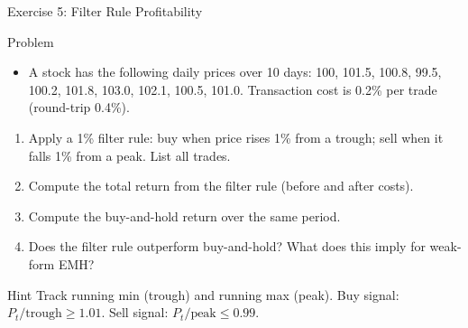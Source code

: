 \documentclass[9pt, aspectratio=169, t]{beamer}
\theoremstyle{definition}
\begin{document}
\begin{frame}{Exercise 5: Filter Rule Profitability}
\begin{block}{Problem}
\begin{itemize}
\item A stock has the following daily prices over 10 days: 100, 101.5, 100.8, 99.5, 100.2, 101.8, 103.0, 102.1, 100.5, 101.0. Transaction cost is 0.2\% per trade (round-trip 0.4\%).
\end{itemize}
\end{block}
\begin{enumerate}
    \item Apply a 1\% filter rule: buy when price rises 1\% from a trough; sell when it falls 1\% from a peak. List all trades.
    \item Compute the total return from the filter rule (before and after costs).
    \item Compute the buy-and-hold return over the same period.
    \item Does the filter rule outperform buy-and-hold? What does this imply for weak-form EMH?
\end{enumerate}
\vspace{0.1cm}
\begin{exampleblock}{Hint}
Track running min (trough) and running max (peak). Buy signal: $P_t / \text{trough} \geq 1.01$. Sell signal: $P_t / \text{peak} \leq 0.99$.
\end{exampleblock}
\end{frame}
\end{document}
